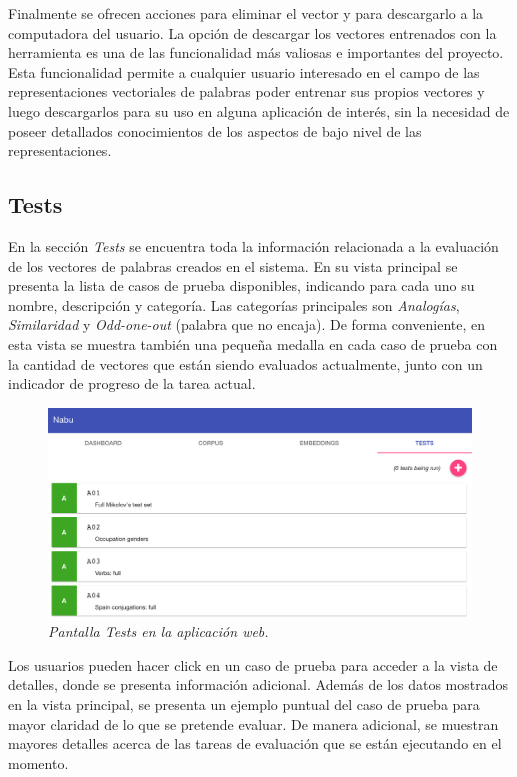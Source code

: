 Finalmente se ofrecen acciones para eliminar el vector y para descargarlo a la computadora del usuario. La
opción de descargar los vectores entrenados con la herramienta es una de las funcionalidad más valiosas e
importantes del proyecto. Esta funcionalidad permite a cualquier usuario interesado en el campo de las
representaciones vectoriales de palabras poder entrenar sus propios vectores y luego descargarlos para su
uso en alguna aplicación de interés, sin la necesidad de poseer detallados conocimientos de los aspectos de
bajo nivel de las representaciones.

\subsection{Tests}

En la sección \textit{Tests} se encuentra toda la información relacionada a la evaluación de los vectores
de palabras creados en el sistema. En su vista principal se presenta la lista de casos de prueba
disponibles, indicando para cada uno su nombre, descripción y categoría. Las categorías principales son
\textit{Analogías}, \textit{Similaridad} y \textit{Odd-one-out} (palabra que no encaja). De forma
conveniente, en esta vista se muestra también una pequeña medalla en cada caso de prueba con la cantidad
de vectores que están siendo evaluados actualmente, junto con un indicador de progreso de la tarea actual.

\begin{figure}[h]
    \centering
    \includegraphics[width=\textwidth]{images/ui-nabu-tests}
    \caption{\textit{Pantalla Tests en la aplicación web.}}
    \label{fig:ui-nabu-tests}
\end{figure}

Los usuarios pueden hacer click en un caso de prueba para acceder a la vista de detalles, donde se
presenta información adicional. Además de los datos mostrados en la vista principal, se presenta un
ejemplo puntual del caso de prueba para mayor claridad de lo que se pretende evaluar. De manera adicional,
se muestran mayores detalles acerca de las tareas de evaluación que se están ejecutando en el momento.

